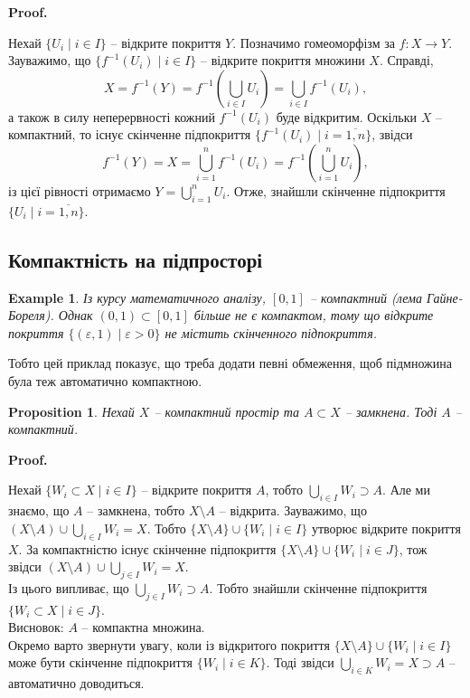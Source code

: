 \documentclass[a4paper, 10pt]{article}
\makeatletter
\theoremstyle{theoremdd}
\newtheorem{example}[theorem]{Example}
\newtheorem{proposition}[theorem]{Proposition}
\renewenvironment{proof}[1][Proof.\\]{\par
\pushQED{\hfill \qed}%
\normalfont \topsep6\p@\@plus6\p@\relax
\trivlist
\item\relax
{\bfseries
#1\@addpunct{.}}\hspace\labelsep\ignorespaces
}{%
\popQED\endtrivlist\@endpefalse
}
\makeatother
\begin{document}
\begin{proof}
Нехай $\{U_i \mid i \in I\}$ -- відкрите покриття $Y$. Позначимо гомеоморфізм за $f \colon X \to Y$. Зауважимо, що $\{ f^{-1}(U_i) \mid i \in I \}$ -- відкрите покриття множини $X$. Справді, 
\[
X = f^{-1}(Y) = \displaystyle f^{-1}\left( \bigcup_{i \in I} U_i \right) = \bigcup_{i \in I} f^{-1}(U_i),
\]
а також в силу неперервності кожний $f^{-1}(U_i)$ буде відкритим. Оскільки $X$ -- компактний, то існує скінченне підпокриття $\{f^{-1}(U_i) \mid i = \overline{1,n}\}$, звідси 
\[
f^{-1}(Y) = X = \displaystyle\bigcup_{i=1}^n f^{-1}(U_i) = f^{-1}\left(\bigcup_{i=1}^n U_i \right),
\] із цієї рівності отримаємо $Y = \displaystyle\bigcup_{i=1}^n U_i$. Отже, знайшли скінченне підпокриття $\{U_i \mid i = \overline{1,n}\}$.
\end{proof}

\subsection{Компактність на підпросторі}
\begin{example}
Із курсу математичного аналізу, $[0,1]$ -- компактний (\textit{лема Гайне-Бореля}). Однак $(0,1) \subset [0,1]$ більше не є компактом, тому що відкрите покриття $\{(\varepsilon,1) \mid \varepsilon > 0\}$ не містить скінченного підпокриття.
\end{example}
\noindent
Тобто цей приклад показує, що треба додати певні обмеження, щоб підмножина була теж автоматично компактною.

\begin{proposition}
Нехай $X$ -- компактний простір та $A \subset X$ -- замкнена. Тоді $A$ -- компактний.
\end{proposition}

\begin{proof}
Нехай $\{W_i \subset X \mid i \in I\}$ -- відкрите покриття $A$, тобто $\displaystyle\bigcup_{i \in I} W_i \supset A$. Але ми знаємо, що $A$ -- замкнена, тобто $X \setminus A$ -- відкрита. Зауважимо, що $\displaystyle (X \setminus A) \cup \bigcup_{i \in I} W_i = X$. Тобто $\{X \setminus A\} \cup \{W_i \mid i \in I\}$ утворює відкрите покриття $X$. За компактністю існує скінченне підпокриття $\{X \setminus A\} \cup \{W_i \mid i \in J\}$, тож звідси $\displaystyle (X \setminus A) \cup \bigcup_{j \in I} W_i = X$.\\
Із цього випливає, що $\displaystyle\bigcup_{j \in I} W_i \supset A$. Тобто знайшли скінченне підпокриття $\{W_i \subset X \mid i \in J\}$.\\
Висновок: $A$ -- компактна множина.
\bigskip \\
Окремо варто звернути увагу, коли із відкритого покриття $\{X \setminus A\} \cup \{W_i \mid i \in I\}$ може бути скінченне підпокриття $\{W_i \mid i \in K\}$. Тоді звідси $\displaystyle\bigcup_{i \in K} W_i = X \supset A$ --  автоматично доводиться.
\end{proof}
\end{document}
